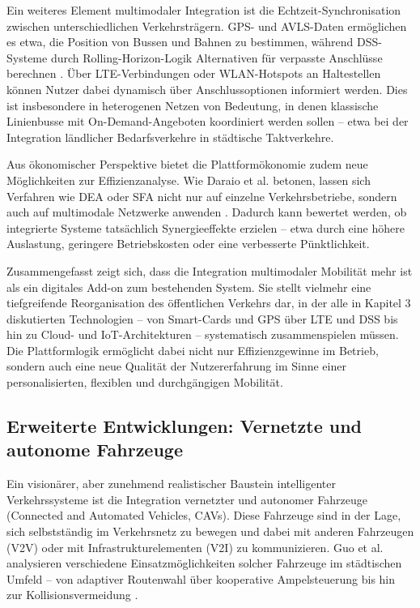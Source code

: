 Ein weiteres Element multimodaler Integration ist die Echtzeit-Synchronisation zwischen unterschiedlichen Verkehrsträgern. GPS- und AVLS-Daten ermöglichen es etwa, die Position von Bussen und Bahnen zu bestimmen, während DSS-Systeme durch Rolling-Horizon-Logik Alternativen für verpasste Anschlüsse berechnen \cite{Luo2019}. Über LTE-Verbindungen oder WLAN-Hotspots an Haltestellen können Nutzer dabei dynamisch über Anschlussoptionen informiert werden. Dies ist insbesondere in heterogenen Netzen von Bedeutung, in denen klassische Linienbusse mit On-Demand-Angeboten koordiniert werden sollen – etwa bei der Integration ländlicher Bedarfsverkehre in städtische Taktverkehre.

Aus ökonomischer Perspektive bietet die Plattformökonomie zudem neue Möglichkeiten zur Effizienzanalyse. Wie Daraio et al. betonen, lassen sich Verfahren wie DEA oder SFA nicht nur auf einzelne Verkehrsbetriebe, sondern auch auf multimodale Netzwerke anwenden \cite{Daraio2016}. Dadurch kann bewertet werden, ob integrierte Systeme tatsächlich Synergieeffekte erzielen – etwa durch eine höhere Auslastung, geringere Betriebskosten oder eine verbesserte Pünktlichkeit.

Zusammengefasst zeigt sich, dass die Integration multimodaler Mobilität mehr ist als ein digitales Add-on zum bestehenden System. Sie stellt vielmehr eine tiefgreifende Reorganisation des öffentlichen Verkehrs dar, in der alle in Kapitel 3 diskutierten Technologien – von Smart-Cards und GPS über LTE und DSS bis hin zu Cloud- und IoT-Architekturen – systematisch zusammenspielen müssen. Die Plattformlogik ermöglicht dabei nicht nur Effizienzgewinne im Betrieb, sondern auch eine neue Qualität der Nutzererfahrung im Sinne einer personalisierten, flexiblen und durchgängigen Mobilität.

\subsection{Erweiterte Entwicklungen: Vernetzte und autonome Fahrzeuge}

Ein visionärer, aber zunehmend realistischer Baustein intelligenter Verkehrssysteme ist die Integration vernetzter und autonomer Fahrzeuge (Connected and Automated Vehicles, CAVs). Diese Fahrzeuge sind in der Lage, sich selbstständig im Verkehrsnetz zu bewegen und dabei mit anderen Fahrzeugen (V2V) oder mit Infrastrukturelementen (V2I) zu kommunizieren. Guo et al. analysieren verschiedene Einsatzmöglichkeiten solcher Fahrzeuge im städtischen Umfeld – von adaptiver Routenwahl über kooperative Ampelsteuerung bis hin zur Kollisionsvermeidung \cite{Guo2019}.

